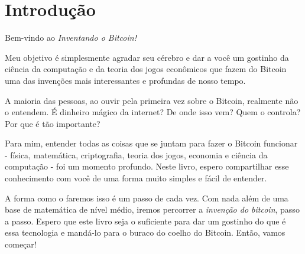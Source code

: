 \chapter*{Introdução}
\label{ch:introducao}

Bem-vindo ao \textit{Inventando o Bitcoin!}

Meu objetivo é simplesmente agradar seu cérebro e dar a você um gostinho da ciência da computação e da teoria dos jogos econômicos que fazem do Bitcoin uma das invenções mais interessantes e profundas de nosso tempo.

A maioria das pessoas, ao ouvir pela primeira vez sobre o Bitcoin, realmente não o entendem. É dinheiro mágico da internet? De onde isso vem? Quem o controla? Por que é tão importante?

Para mim, entender todas as coisas que se juntam para fazer o Bitcoin funcionar - física, matemática, criptografia, teoria dos jogos, economia e ciência da computação - foi um momento profundo. Neste livro, espero compartilhar esse conhecimento com você de uma forma muito simples e fácil de entender.

A forma como o faremos isso é um passo de cada vez. Com nada além de uma base de matemática de nível médio, iremos percorrer a \textit{invenção do bitcoin}, passo a passo. Espero que este livro seja o suficiente para dar um gostinho do que é essa tecnologia e mandá-lo para o buraco do coelho do Bitcoin. Então, vamos começar!